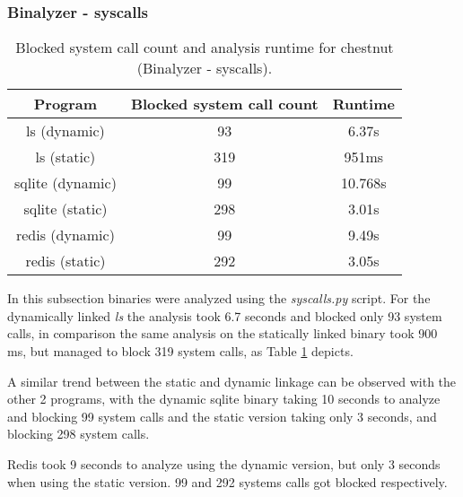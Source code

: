 \subsubsection {Binalyzer - syscalls}
\begin{table}[!h]
\begin{center}
\caption{Blocked system call count and analysis runtime for chestnut (Binalyzer - syscalls).}
\label{tbl:chestnut_bin_sys_results}
\begin{tabular}{||c c c||} 
 \hline
 Program & Blocked system call count & Runtime \\
 \hline\hline
 ls (dynamic) & 93 & 6.37s \\ 
 \hline
 ls (static) & 319 & 951ms \\ 
 \hline
 sqlite (dynamic) & 99 & 10.768s \\ 
 \hline
 sqlite (static) & 298 & 3.01s \\ 
 \hline
 redis (dynamic) & 99 & 9.49s \\ 
 \hline
 redis (static) & 292 & 3.05s \\ 
 \hline
\end{tabular}
\end{center}
\end{table}
In this subsection binaries were analyzed using the \textit{syscalls.py} script.
For the dynamically linked \textit{ls} the analysis took 6.7 seconds and blocked only 93 system calls, in comparison the same analysis on the statically linked binary took 900 ms, but managed to block 319 system calls, as Table \ref{tbl:chestnut_bin_sys_results} depicts.

A similar trend between the static and dynamic linkage can be observed with the other 2 programs, with the dynamic sqlite binary taking 10 seconds to analyze and blocking 99 system calls and the static version taking only 3 seconds, and blocking 298 system calls.

Redis took 9 seconds to analyze using the dynamic version, but only 3 seconds when using the static version. 99 and 292 systems calls got blocked respectively.

